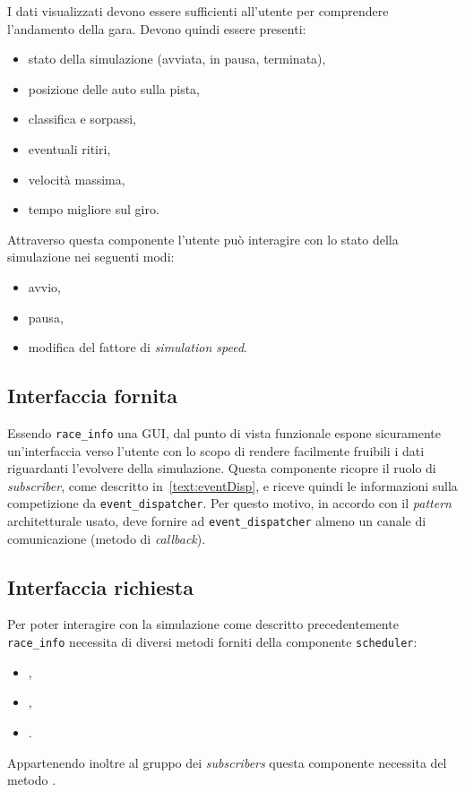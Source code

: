 I dati visualizzati devono essere sufficienti all'utente per comprendere l'andamento della gara. Devono quindi essere presenti:
\begin{itemize}
\item stato della simulazione (avviata, in pausa, terminata),
\item posizione delle auto sulla pista,
\item classifica e sorpassi,
\item eventuali ritiri,
\item velocità massima,
\item tempo migliore sul giro.
\end{itemize}
Attraverso questa componente l'utente può interagire con lo stato della simulazione nei seguenti modi:
\begin{itemize}
\item avvio,
\item pausa,
\item modifica del fattore di \textit{simulation speed}.
\end{itemize}

\subsection*{Interfaccia fornita}
Essendo \texttt{race\_info} una GUI, dal punto di vista funzionale espone sicuramente un'interfaccia verso l'utente con lo scopo di rendere facilmente fruibili i dati riguardanti l'evolvere della simulazione.
Questa componente ricopre il ruolo di \textit{subscriber}, come descritto in~\ref{text:eventDisp}, e riceve quindi le informazioni sulla competizione da \texttt{event\_dispatcher}. Per questo motivo, in accordo con il \textit{pattern} architetturale usato, deve fornire ad \texttt{event\_dispatcher} almeno un canale di comunicazione (metodo di \textit{callback}).

\subsection*{Interfaccia richiesta}
Per poter interagire con la simulazione come descritto precedentemente \texttt{race\_info} necessita di diversi metodi forniti della componente \texttt{scheduler}:
\begin{itemize}
\item {},
\item {},
\item {}.
\end{itemize}
Appartenendo inoltre al gruppo dei \textit{subscribers} questa componente necessita del metodo .

